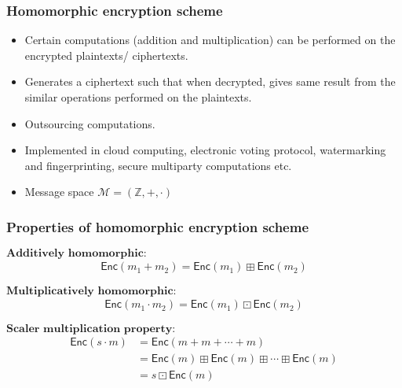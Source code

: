 \documentclass{beamer}
\begin{document}
\begin{frame}[t]
\frametitle{Homomorphic encryption scheme}

\begin{itemize}

\item  Certain computations (addition and multiplication) can be performed on the encrypted plaintexts/ ciphertexts.   
\vspace*{3mm}
\item   Generates a ciphertext such that when decrypted, gives same result from the similar operations performed on the plaintexts.
\vspace*{3mm}
\item Outsourcing computations.
\vspace*{3mm}
\item Implemented in cloud computing, electronic voting protocol, watermarking and fingerprinting, secure multiparty computations etc.
\vspace*{3mm}
\item Message space $\mathcal{M}=(\mathbb{Z},+,\cdot)$

\end{itemize}
\end{frame}


\begin{frame}[t]
\frametitle{Properties of homomorphic encryption scheme}

\begin{block}{$\textbf{Additively homomorphic:}$}
\begin{align*}
\mathsf{Enc}(m_1+m_2)=\mathsf{Enc}(m_1) \boxplus \mathsf{Enc}(m_2)
\end{align*}
\end{block}

\begin{block}{$\textbf{Multiplicatively homomorphic:}$}
\begin{align*}
\mathsf{Enc}(m_1\cdot m_2)=\mathsf{Enc}(m_1) \boxdot \mathsf{Enc}(m_2)
\end{align*}
\end{block}

\begin{block}{$\textbf{Scaler multiplication property:}$}
\begin{align*}
\mathsf{Enc}(s\cdot m)&=\mathsf{Enc}(m+m+\cdots+m)\\&= \mathsf{Enc}(m)\boxplus \mathsf{Enc}(m)\boxplus \cdots \boxplus \mathsf{Enc}(m)\\& =s \boxdot \mathsf{Enc}(m)
\end{align*}
\end{block}
\end{frame}
\end{document}
